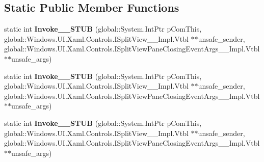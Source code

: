 \subsection*{Static Public Member Functions}
\begin{DoxyCompactItemize}
\item 
\mbox{\label{struct_windows_1_1_foundation_1_1_typed_event_handler___a___windows___u_i___xaml___controls___spf724c7b43c58a64da16977f053e6f78f_a9bdb9989841243bd96f4bf9857967ecb}} 
static int {\bfseries Invoke\+\_\+\+\_\+\+S\+T\+UB} (global\+::\+System.\+Int\+Ptr p\+Com\+This, global\+::\+Windows.\+U\+I.\+Xaml.\+Controls.\+I\+Split\+View\+\_\+\+\_\+\+Impl.\+Vtbl $\ast$$\ast$unsafe\+\_\+sender, global\+::\+Windows.\+U\+I.\+Xaml.\+Controls.\+I\+Split\+View\+Pane\+Closing\+Event\+Args\+\_\+\+\_\+\+Impl.\+Vtbl $\ast$$\ast$unsafe\+\_\+args)
\item 
\mbox{\label{struct_windows_1_1_foundation_1_1_typed_event_handler___a___windows___u_i___xaml___controls___spf724c7b43c58a64da16977f053e6f78f_a9bdb9989841243bd96f4bf9857967ecb}} 
static int {\bfseries Invoke\+\_\+\+\_\+\+S\+T\+UB} (global\+::\+System.\+Int\+Ptr p\+Com\+This, global\+::\+Windows.\+U\+I.\+Xaml.\+Controls.\+I\+Split\+View\+\_\+\+\_\+\+Impl.\+Vtbl $\ast$$\ast$unsafe\+\_\+sender, global\+::\+Windows.\+U\+I.\+Xaml.\+Controls.\+I\+Split\+View\+Pane\+Closing\+Event\+Args\+\_\+\+\_\+\+Impl.\+Vtbl $\ast$$\ast$unsafe\+\_\+args)
\item 
\mbox{\label{struct_windows_1_1_foundation_1_1_typed_event_handler___a___windows___u_i___xaml___controls___spf724c7b43c58a64da16977f053e6f78f_a9bdb9989841243bd96f4bf9857967ecb}} 
static int {\bfseries Invoke\+\_\+\+\_\+\+S\+T\+UB} (global\+::\+System.\+Int\+Ptr p\+Com\+This, global\+::\+Windows.\+U\+I.\+Xaml.\+Controls.\+I\+Split\+View\+\_\+\+\_\+\+Impl.\+Vtbl $\ast$$\ast$unsafe\+\_\+sender, global\+::\+Windows.\+U\+I.\+Xaml.\+Controls.\+I\+Split\+View\+Pane\+Closing\+Event\+Args\+\_\+\+\_\+\+Impl.\+Vtbl $\ast$$\ast$unsafe\+\_\+args)
\item 

\end{DoxyCompactItemize}
